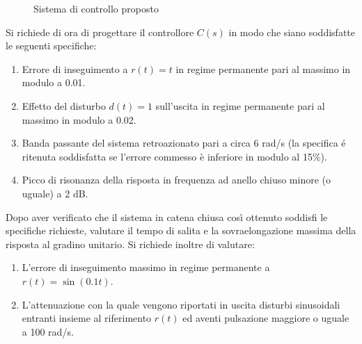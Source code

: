 \documentclass[../main.tex]{subfiles}
\begin{document}
\begin{figure}[h]
\begin{center}

\caption{Sistema di controllo proposto}
\label{fig:E701}
\end{center}
\end{figure}



Si richiede di ora di progettare il controllore $C(s)$ in modo che siano soddisfatte le seguenti specifiche:

\begin{enumerate}[label=\alph*)]
	\item Errore di inseguimento a $r(t) = t$ in regime permanente pari al massimo in modulo a 0.01.
	\item Effetto del disturbo $d(t) = 1$ sull’uscita in regime permanente pari al massimo in modulo a 0.02.
	\item Banda passante del sistema retroazionato pari a circa 6 rad/s (la specifica é ritenuta soddisfatta se l’errore commesso è inferiore in modulo al 15\%).
	\item Picco di risonanza della risposta in frequenza ad anello chiuso minore (o uguale) a 2 dB.
\end{enumerate}

Dopo aver verificato che il sistema in catena chiusa così ottenuto soddisfi le specifiche richieste, valutare il tempo di salita e la sovraelongazione massima della risposta al gradino unitario. Si richiede inoltre di valutare:

\begin{enumerate}
	\item[\textbf{-}] L'errore di inseguimento massimo in regime permanente a $r(t) = \sin(0.1 t)$.
	\item[\textbf{-}] L’attenuazione con la quale vengono riportati in uscita disturbi sinusoidali entranti insieme al riferimento $r(t)$ ed aventi pulsazione maggiore o uguale a 100 rad/s.
\end{enumerate}
\end{document}
